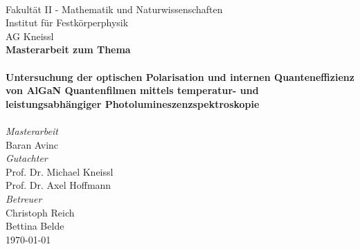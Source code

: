 
\begin{titlepage}
		\pagestyle{fancy}
		 \\
		\vspace{1cm} 
		\centering Fakultät II - Mathematik und Naturwissenschaften \\
		\centering Institut für Festkörperphysik \\
		\centering AG Kneissl \\
		\vspace{0.5cm}
		\centering\textbf{\large Masterarbeit zum Thema}\\
		\vspace{0.5cm} 
		\noindent{\color{RoyalPurple}\rule{\textwidth}{1pt}} \\
		\vspace{0.5cm} 
		\centering\textbf{\large Untersuchung der optischen Polarisation und internen Quanteneffizienz von AlGaN Quantenfilmen mittels temperatur- und leistungsabhängiger Photolumineszenzspektroskopie} \\
		\vspace{0.25cm} 
		\noindent{\color{RoyalPurple}\rule{\textwidth}{1pt}} \\
		\vspace{1cm}
		\centering \emph{ \large{Masterarbeit}} \\
		\centering Baran Avinc \\
		\vspace{1cm}
		\centering \emph{ \large{Gutachter}} \\
		\centering Prof. Dr. Michael Kneissl \\
		\centering Prof. Dr. Axel Hoffmann  \\
		\vspace{0.5cm} 
		\centering \emph{ \large{Betreuer}} \\
		\centering Christoph Reich \\
		\centering Bettina Belde \\
		\vspace{1cm}
		\centering  \today
\end{titlepage}


